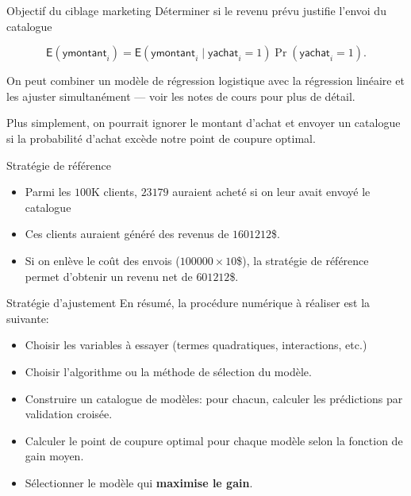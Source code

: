 \documentclass[
  ignorenonframetext,
]{beamer}
\providecommand{\tightlist}{%
  \setlength{\itemsep}{0pt}\setlength{\parskip}{0pt}}\usepackage{longtable,booktabs,array}
\begin{document}
\begin{frame}{Objectif du ciblage marketing}
\protect\hypertarget{objectif-du-ciblage-marketing}{}
Déterminer si le revenu prévu justifie l'envoi du catalogue

\[\mathsf{E}(\textsf{ymontant}_i) = \mathsf{E}(\textsf{ymontant}_i \mid \textsf{yachat}_i = 1)\Pr(\textsf{yachat}_i = 1).\]

On peut combiner un modèle de régression logistique avec la régression
linéaire et les ajuster simultanément --- voir les notes de cours pour
plus de détail.

Plus simplement, on pourrait ignorer le montant d'achat et envoyer un
catalogue si la probabilité d'achat excède notre point de coupure
optimal.
\end{frame}

\begin{frame}{Stratégie de référence}
\protect\hypertarget{stratuxe9gie-de-ruxe9fuxe9rence}{}
\begin{itemize}
\tightlist
\item
  Parmi les \(100\)K clients, \(23 179\) auraient acheté si on leur
  avait envoyé le catalogue
\item
  Ces clients auraient généré des revenus de \(1 601 212\)\$.
\item
  Si on enlève le coût des envois (\(100 000 \times 10\)\$), la
  stratégie de référence permet d'obtenir un revenu net de
  \(601 212\)\$.
\end{itemize}
\end{frame}

\begin{frame}{Stratégie d'ajustement}
\protect\hypertarget{stratuxe9gie-dajustement}{}
En résumé, la procédure numérique à réaliser est la suivante:

\begin{itemize}
\tightlist
\item
  Choisir les variables à essayer (termes quadratiques, interactions,
  etc.)
\item
  Choisir l'algorithme ou la méthode de sélection du modèle.
\item
  Construire un catalogue de modèles: pour chacun, calculer les
  prédictions par validation croisée.
\item
  Calculer le point de coupure optimal pour chaque modèle selon la
  fonction de gain moyen.
\item
  Sélectionner le modèle qui \textbf{maximise le gain}.
\end{itemize}
\end{frame}
\end{document}
